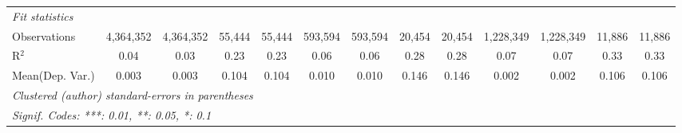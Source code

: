 \begin{tabular}{lcccccccccccc}
   \midrule
   \emph{Fit statistics}\\
   Observations                             & 4,364,352      & 4,364,352        & 55,444  & 55,444         & 593,594        & 593,594         & 20,454        & 20,454         & 1,228,349      & 1,228,349        & 11,886       & 11,886\\  
   R$^2$                                    & 0.04           & 0.03             & 0.23    & 0.23           & 0.06           & 0.06            & 0.28          & 0.28           & 0.07           & 0.07             & 0.33         & 0.33\\  
Mean(Dep. Var.) & 0.003 & 0.003 & 0.104 & 0.104 & 0.010 & 0.010 & 0.146 & 0.146 & 0.002 & 0.002 & 0.106 & 0.106 \\
   \midrule \midrule
   \multicolumn{13}{l}{\emph{Clustered (author) standard-errors in parentheses}}\\
   \multicolumn{13}{l}{\emph{Signif. Codes: ***: 0.01, **: 0.05, *: 0.1}}\\
\end{tabular}
\par\endgroup
